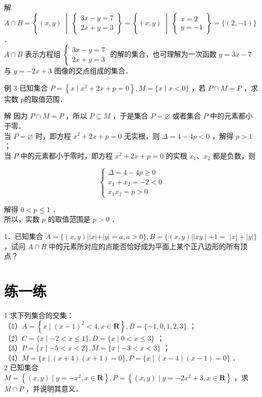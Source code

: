 \documentclass[10pt]{article}
\begin{document}
解 \(A \cap B=\left\{(x, y) \;\middle|\; \begin{cases} 3x - y = 7 \\ 2x + y = 3 \end{cases} \right\} = \left\{(x, y) \;\middle|\; \begin{cases} x = 2 \\ y = -1 \end{cases} \right\} = \{(2, -1)\}\) ．\\
\(A \cap B\) 表示方程组 \(\begin{cases} 3x - y = 7 \\ 2x + y = 3 \end{cases}\) 的解的集合，也可理解为一次函数 \(y=3x-7\) 与 \(y=-2x+3\) 图像的交点组成的集合．

例 3 已知集合 \(P=\left\{x \mid x^{2}+2 x+p=0\right\}, M=\{x \mid x<0\}\) ，若 \(P \cap M=P\) ，求实数 \(p\)的取值范围．

解 因为 \(P \cap M=P\) ，所以 \(P \subseteq M\) ，于是集合 \(P=\varnothing\) 或者集合 \(P\) 中的元素都小于零．\\
当 \(P=\varnothing\) 时，即方程 \(x^{2}+2 x+p=0\) 无实根，则 \(\Delta=4-4 p<0\) ，解得 \(p>1\) ；\\
当 \(P\) 中的元素都小于零时，即方程 \(x^{2}+2 x+p=0\) 的实根 \(x_{1} 、 x_{2}\) 都是负数，则

\[
\left\{\begin{array}{l}
\Delta=4-4 p \geqslant 0 \\
x_{1}+x_{2}=-2<0 \\
x_{1} x_{2}=p>0
\end{array}\right.
\]

解得 \(0<p \leqslant 1\) ．\\
所以，实数 \(p\) 的取值范围是 \(p>0\) ．

1．已知集合 \(A=\{(x, y)| | x|+|y|=a, a>0\}, B=\{(x, y)| | x y \mid+1=\) \(|x|+|y|\}\) ，试问 \(A \cap B\) 中的元素所对应的点能否恰好成为平面上某个正八边形的所有顶点？

\section*{练一练}
1 求下列集合的交集：\\
（1）\(A=\left\{x \mid(x-1)^{2}<4, x \in \mathbf{R}\right\}, B=\{-1,0,1,2,3\}\) ；\\
（2）\(C=\{x \mid-2<x \leqslant 1\}, D=\{x \mid 0<x \leqslant 3\}\) ；\\
（3）\(P=\{x \mid-5<x<2\}, M=\{x \mid-3<x<3\}\) ；\\
（4）\(M=\{x \mid(x+4)(x+1)=0\}, P=\{x \mid(x-4)(x-1)=0\}\) ．\\
2 已知集合 \(M=\left\{(x, y) \mid y=-x^{2}, x \in \mathbf{R}\right\}, P=\left\{(x, y) \mid y=-2 x^{2}+3, x \in \mathbf{R}\right\}\) ，求 \(M \cap P\) ，并说明其意义．
\end{document}
